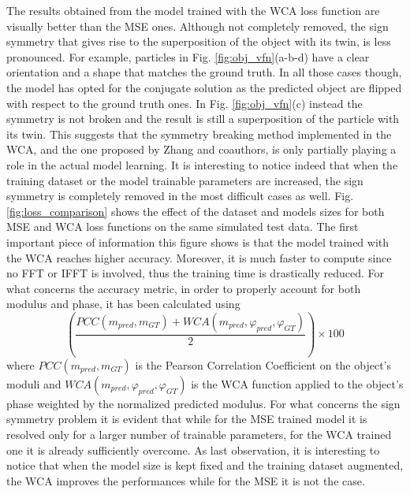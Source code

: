 The results obtained from the model trained with the WCA loss function are visually better than the MSE ones. Although not 
completely removed, the sign symmetry that gives rise to the superposition of the object with its twin, is less pronounced. 
For example, particles in Fig. \ref{fig:obj_vfn}(a-b-d) have a clear orientation and a shape that matches the ground truth. 
In all those cases though, the model has opted for the conjugate solution as the predicted object are flipped with respect to 
the ground truth ones. In Fig. \ref{fig:obj_vfn}(c) instead the symmetry is not broken and the result is still a superposition 
of the particle with its twin. This suggests that the symmetry breaking method implemented in the WCA, and the one proposed by 
Zhang and coauthors, is only partially playing a role in the actual model learning. It is interesting to notice indeed that 
when the training dataset or the model trainable parameters are increased, the sign symmetry is completely removed in the most 
difficult cases as well. Fig. \ref{fig:loss_comparison} shows the effect of the dataset and models sizes for both MSE and WCA 
loss functions on the same simulated test data. The first important piece of information this figure shows is that the model trained 
with the WCA reaches higher accuracy. Moreover, it is much faster to compute since no FFT or IFFT is involved, thus the training time 
is drastically reduced. For what concerns the accuracy metric, in order to properly account for both modulus and phase, 
it has been calculated using 
\begin{equation}
 \left(\frac{PCC(m_{pred}, m_{GT}) + WCA(m_{pred},\varphi_{pred},\varphi_{GT} )}{2}\right)\times 100
 \label{eq:accuracy_phasing}
\end{equation}
where $PCC(m_{pred}, m_{GT})$ is the Pearson Correlation Coefficient on the object's moduli and $WCA(m_{pred},\varphi_{pred},\varphi_{GT} )$ is the WCA function 
applied to the object's phase weighted by the normalized predicted modulus. For what concerns the sign symmetry problem it is evident that while for 
the MSE trained model it is resolved only for a larger number of trainable parameters, for the WCA trained one it is already 
sufficiently overcome. As last observation, it is interesting to notice that when the model size is kept fixed and the training 
dataset augmented, the WCA improves the performances while for the MSE it is not the case. 

